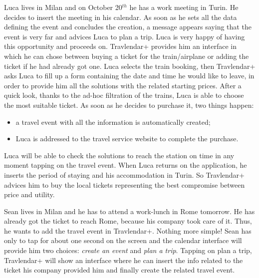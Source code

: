 Luca lives in Milan and on October 20$^{th}$ he has a work meeting in Turin. He decides to insert the meeting in his calendar. As soon as he sets all the data defining the event and concludes the creation, a message appears saying that the event is very far and advices Luca to plan a trip. Luca is very happy of having this opportunity and proceeds on. Travlendar+ provides him an interface in which he can chose between buying a ticket for the train/airplane or adding the ticket if he had already got one. Luca selects the train booking, then Travlendar+ asks Luca to fill up a form containing the date and time he would like to leave, in order to provide him all the solutions with the related starting prices. After a quick look, thanks to the ad-hoc filtration of the trains, Luca is able to choose the most suitable ticket. As soon as he decides to purchase it, two things happen: 
\begin{itemize}
	\setlength{\leftskip}{0.5cm}
	\item a travel event with all the information is automatically created;
	\item Luca is addressed to the travel service website to complete the purchase.
\end{itemize}
Luca will be able to check the solutions to reach the station on time in any moment tapping on the travel event.
When Luca returns on the application, he inserts the period of staying and his accommodation in Turin. So Travlendar+ advices him to buy the local tickets representing the best compromise between price and utility.

Sean lives in Milan and he has to attend a work-lunch in Rome tomorrow. He has already got the ticket to reach Rome, because his company took care of it. Thus, he wants to add the travel event in Travlendar+. Nothing more simple! Sean has only to tap for about one second on the screen and the calendar interface will provide him two choices: \emph{create an event} and \emph{plan a trip}. Tapping on plan a trip, Travlendar+ will show an interface where he can insert the info related to the ticket his company provided him and finally create the related travel event.

